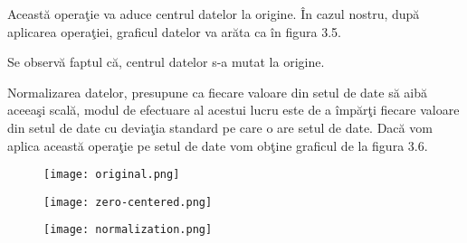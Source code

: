 Aceast\u{a} opera\c{t}ie va aduce centrul datelor la origine. \^{I}n cazul nostru, dup\u{a} aplicarea opera\c{t}iei, graficul datelor va ar\u{a}ta ca \^{i}n figura 3.5.

Se observ\u{a} faptul c\u{a}, centrul datelor s-a mutat la origine.

Normalizarea datelor, presupune ca fiecare valoare din setul de date s\u{a} aib\u{a} aceea\c{s}i scal\u{a}, modul de efectuare al acestui lucru este de a \^{i}mp\u{a}r\c{t}i fiecare valoare din setul de date cu devia\c{t}ia standard pe care o are setul de date. Dac\u{a} vom aplica aceast\u{a} opera\c{t}ie pe setul de date vom ob\c{t}ine graficul de la figura 3.6.

\begin{figure}[h!]
  \centering
  \texttt{[image: original.png]}
\end{figure}

\begin{figure}[h!]
  \centering
  \texttt{[image: zero-centered.png]}
\end{figure}

\begin{figure}[h!]
  \centering
  \texttt{[image: normalization.png]}
\end{figure}
